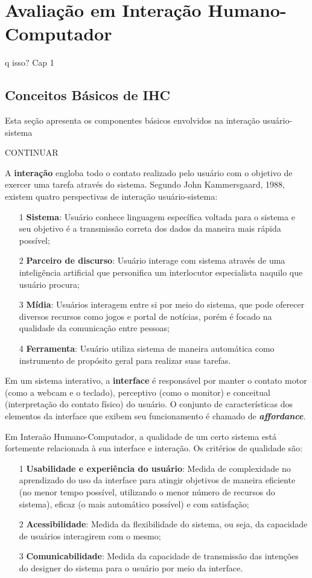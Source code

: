 \chapter{Avaliação em Interação Humano-Computador}

q isso? Cap 1

\section{Conceitos Básicos de IHC} \label{cbIHC}

\indent Esta seção apresenta os componentes básicos envolvidos na interação usuário-sistema 

\indent CONTINUAR

\indent A \textbf{interação} engloba todo o contato realizado pelo usuário com o objetivo de exercer uma tarefa através do sistema. Segundo John Kammersgaard, 1988, existem quatro perspectivas de interação usuário-sistema:
\begin{itemize}
\item[1] \textbf{Sistema}: Usuário conhece linguagem específica voltada para o sistema e seu objetivo é a transmissão correta dos dados da maneira mais rápida possível;
\item[2] \textbf{Parceiro de discurso}: Usuário interage com sistema através de uma inteligência artificial que personifica um interlocutor especialista naquilo que usuário procura;
\item[3] \textbf{Mídia}: Usuários interagem entre si por meio do sistema, que pode oferecer diversos recursos como jogos e portal de notícias, porém é focado na qualidade da comunicação entre pessoas;
\item[4] \textbf{Ferramenta}: Usuário utiliza sistema de maneira automática como instrumento de propósito geral para realizar suas tarefas. 
\end{itemize}

\indent Em um sistema interativo, a \textbf{interface} é responsável por manter o contato motor (como a webcam e o teclado), perceptivo (como o monitor) e conceitual (interpretação do contato físico) do usuário. O conjunto de características dos elementos da interface que exibem seu funcionamento é chamado de \textbf{\textit{affordance}}. 

\indent Em Interaão Humano-Computador, a qualidade de um certo sistema está fortemente relacionada à sua interface e interação. Os critérios de qualidade são:
\begin{itemize}
\item[1] \textbf{Usabilidade e experiência do usuário}: Medida de complexidade no aprendizado do uso da interface para atingir objetivos de maneira eficiente (no menor tempo possível, utilizando o menor número de recursos do sistema), eficaz (o mais automático possível) e com satisfação;
\item[2] \textbf{Acessibilidade}: Medida da flexibilidade do sistema, ou seja, da capacidade de usuários interagirem com o mesmo;
\item[3] \textbf{Comunicabilidade}: Medida da capacidade de transmissão das intenções do designer do sistema para o usuário por meio da interface. %
\end{itemize}

